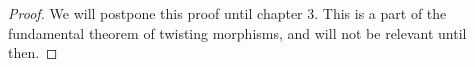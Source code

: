 \documentclass[../thesis.tex]{subfiles}
\begin{document}
            \begin{proof}
                We will postpone this proof until chapter 3. This is a part of the fundamental theorem of twisting morphisms, and will not be relevant until then.
            \end{proof}


        




\end{document}
